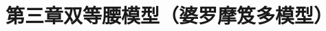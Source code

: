 \part*{第三章\quad 双等腰模型（婆罗摩笈多模型）}
\renewcommand{\theHsection}{03-double-isosceles.\arabic{section}}




